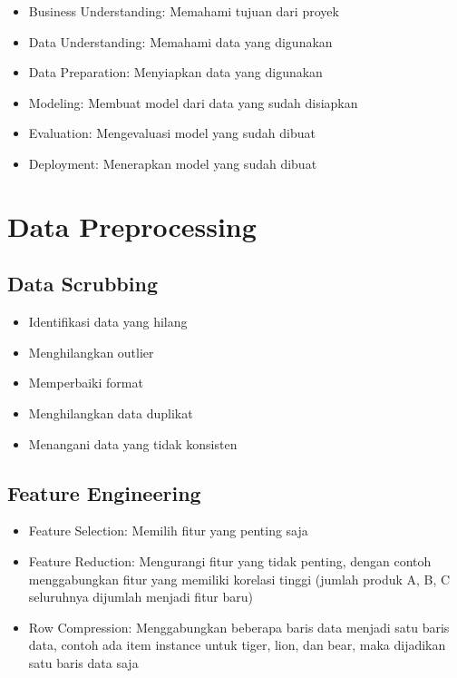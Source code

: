 \documentclass[conference]{IEEEtran}
\begin{document}

\begin{itemize}
    \item Business Understanding: Memahami tujuan dari proyek
    \item Data Understanding: Memahami data yang digunakan
    \item Data Preparation: Menyiapkan data yang digunakan
    \item Modeling: Membuat model dari data yang sudah disiapkan
    \item Evaluation: Mengevaluasi model yang sudah dibuat
    \item Deployment: Menerapkan model yang sudah dibuat
\end{itemize}


\section{Data Preprocessing}

\subsection{Data Scrubbing}
\begin{itemize}
    \item Identifikasi data yang hilang
    \item Menghilangkan outlier
    \item Memperbaiki format
    \item Menghilangkan data duplikat
    \item Menangani data yang tidak konsisten
\end{itemize}

\subsection{Feature Engineering}
\begin{itemize}
    \item Feature Selection: Memilih fitur yang penting saja
    \item Feature Reduction: Mengurangi fitur yang tidak penting, dengan contoh menggabungkan fitur yang memiliki korelasi tinggi (jumlah produk A, B, C seluruhnya dijumlah menjadi fitur baru)
    \item Row Compression: Menggabungkan beberapa baris data menjadi satu baris data, contoh ada item instance untuk tiger, lion, dan bear, maka dijadikan satu baris data saja
\end{itemize}
\end{document}
